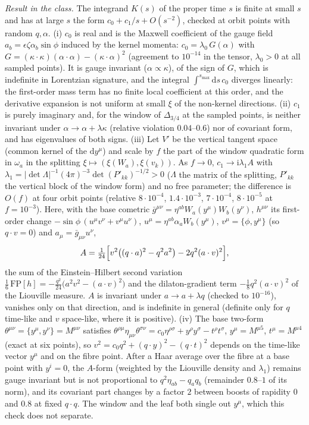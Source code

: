 \emph{Result in the class.} The integrand \(K(s)\) of the proper time \(s\) is finite at small \(s\) and has at large \(s\) the form \(c_0+c_1/s+O(s^{-2})\), checked at orbit points with random \(q,\alpha\). (i) \(c_0\) is real and is the Maxwell coefficient of the gauge field \(a_b=\epsilon\zeta\alpha_b\sin\phi\) induced by the kernel momenta: \(c_0=\lambda_0\,G(\alpha)\) with \(G=(\kappa\cdot\kappa)(\alpha\cdot\alpha)-(\kappa\cdot\alpha)^2\) (agreement to \(10^{-14}\) in the tensor, \(\lambda_0>0\) at all sampled points). It is gauge invariant (\(\alpha\propto\kappa\)), of the sign of \(G\), which is indefinite in Lorentzian signature, and the integral \(\int^{s_{\max}}\mathrm ds\,c_0\) diverges linearly: the first-order mass term has no finite local coefficient at this order, and the derivative expansion is not uniform at small \(\xi\) of the non-kernel directions. (ii) \(c_1\) is purely imaginary and, for the window of \(\Delta_{3/4}\) at the sampled points, is neither invariant under \(\alpha\to\alpha+\lambda\kappa\) (relative violation \(0.04\)--\(0.6\)) nor of covariant form, and has eigenvalues of both signs. (iii) Let \(V'\) be the vertical tangent space (common kernel of the \(\mathrm dy^\mu\)) and scale by \(f\) the part of the window quadratic form in \(\omega_a\) in the splitting \(\xi\mapsto(\xi(W_a),\xi(v_k))\). As \(f\to0\), \(c_1\to\mathrm i\lambda_1 A\) with \(\lambda_1=|\det\Lambda|^{-1}(4\pi)^{-3}\det(P'_{kk})^{-1/2}>0\) (\(\Lambda\) the matrix of the splitting, \(P'_{kk}\) the vertical block of the window form) and no free parameter; the difference is \(O(f)\) at four orbit points (relative \(8\cdot10^{-4}\), \(1.4\cdot10^{-3}\), \(7\cdot10^{-4}\), \(8\cdot10^{-5}\) at \(f=10^{-3}\)). Here, with the base cometric \(\bar g^{\mu\nu}=\eta^{ab}W_a(y^\mu)W_b(y^\nu)\), \(h^{\mu\nu}\) its first-order change \(-\sin\phi\,(u^\mu v^\nu+v^\mu u^\nu)\), \(u^\mu=\eta^{ab}\alpha_aW_b(y^\mu)\), \(v^\mu=\{\phi,y^\mu\}\) (so \(q\cdot v=0\)) and \(a_\mu=\bar g_{\mu\nu}u^\nu\),
\[
A=\tfrac1{24}\Bigl[v^2\bigl((q\cdot a)^2-q^2a^2\bigr)-2q^2(a\cdot v)^2\Bigr],
\]
the sum of the Einstein--Hilbert second variation \(\tfrac16\,\mathrm{FP}[h]=-\tfrac{q^2}{24}\bigl(a^2v^2-(a\cdot v)^2\bigr)\) and the dilaton-gradient term \(-\tfrac18q^2(a\cdot v)^2\) of the Liouville measure. \(A\) is invariant under \(a\to a+\lambda q\) (checked to \(10^{-16}\)), vanishes only on that direction, and is indefinite in general (definite only for \(q\) time-like and \(v\) space-like, where it is positive). (iv) The base two-form \(\theta^{\mu\nu}=\{y^\mu,y^\nu\}=M^{\mu\nu}\) satisfies \(\theta^{\rho\mu}\eta_{\mu\nu}\theta^{\sigma\nu}=c_0\eta^{\rho\sigma}+y^\rho y^\sigma-t^\rho t^\sigma\), \(y^\mu=M^{\mu5}\), \(t^\mu=M^{\mu4}\) (exact at six points), so \(v^2=c_0q^2+(q\cdot y)^2-(q\cdot t)^2\) depends on the time-like vector \(y^\mu\) and on the fibre point. After a Haar average over the fibre at a base point with \(y^i=0\), the \(A\)-form (weighted by the Liouville density and \(\lambda_1\)) remains gauge invariant but is not proportional to \(q^2\eta_{ab}-q_aq_b\) (remainder \(0.8\)--\(1\) of its norm), and its covariant part changes by a factor \(2\) between boosts of rapidity \(0\) and \(0.8\) at fixed \(q\cdot q\). The window and the leaf both single out \(y^\mu\), which this check does not separate.


